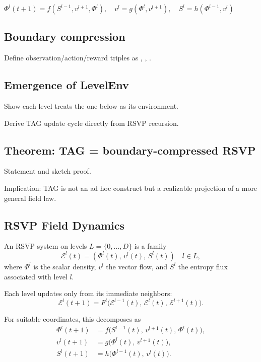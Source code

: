 \documentclass[11pt,a4paper]{article}
\begin{document}
$\Phi^l(t+1)=f(S^{l-1},v^{l+1},\Phi^l),\quad 
v^l=g(\Phi^l,v^{l+1}),\quad 
S^l=h(\Phi^{l-1},v^l)$

\subsection{Boundary compression}

Define observation/action/reward triples as , , .

\subsection{Emergence of LevelEnv}

Show each level treats the one below as its environment.

Derive TAG update cycle directly from RSVP recursion.

\subsection{Theorem: TAG = boundary-compressed RSVP}

Statement and sketch proof.

Implication: TAG is not an ad hoc construct but a realizable projection of a more general field law.

\subsection{RSVP Field Dynamics}
\begin{definition}
An RSVP system on levels $L=\{0,\dots,D\}$ is a family
\[
\mathcal{E}^l(t) = (\Phi^l(t),\, v^l(t),\, S^l(t)) \quad l \in L,
\]
where $\Phi^l$ is the scalar density, $v^l$ the vector flow, and $S^l$ the entropy flux associated with level $l$.
\end{definition}

\begin{axiom}[Locality]
Each level updates only from its immediate neighbors:
\[
\mathcal{E}^l(t+1) = F^l\!\big(\mathcal{E}^{l-1}(t), \, \mathcal{E}^{l}(t), \, \mathcal{E}^{l+1}(t)\big).
\]
\end{axiom}

For suitable coordinates, this decomposes as
\begin{align}
\Phi^l(t+1) &= f\!\big(S^{l-1}(t), \, v^{l+1}(t), \, \Phi^l(t)\big), \\
v^l(t+1)   &= g\!\big(\Phi^l(t), \, v^{l+1}(t)\big), \\
S^l(t+1)   &= h\!\big(\Phi^{l-1}(t), \, v^l(t)\big).
\end{align}
\end{document}
